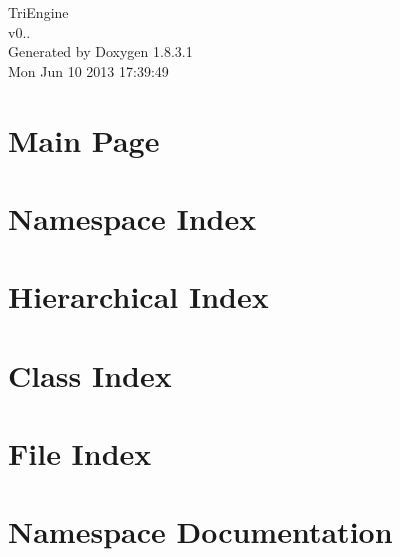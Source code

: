 \documentclass{book}
\begin{document}
\hypersetup{pageanchor=false,citecolor=blue}
\begin{titlepage}
\vspace*{7cm}
\begin{center}
{\Large Tri\-Engine \\[1ex]\large v0.. }\\
\vspace*{1cm}
{\large Generated by Doxygen 1.8.3.1}\\
\vspace*{0.5cm}
{\small Mon Jun 10 2013 17:39:49}\\
\end{center}
\end{titlepage}
\clearemptydoublepage
{}
\tableofcontents
\clearemptydoublepage
{}
\hypersetup{pageanchor=true,citecolor=blue}
\chapter{Main Page}
\label{index}\hypertarget{index}{}
\chapter{Namespace Index}

\chapter{Hierarchical Index}

\chapter{Class Index}

\chapter{File Index}

\chapter{Namespace Documentation}

















\end{document}
